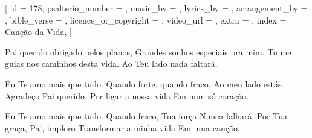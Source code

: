 [
    id                     = {178},
    psalterio_number       = {},
    music_by               = {},
    lyrics_by              = {},
    arrangement_by         = {},
    bible_verse            = {},
    licence_or_copyright   = {},
    video_url              = {},
    extra                  = {},
    index                  = {Canção da Vida},
]


\beginchorus
Pai querido obrigado pelos planos, 
Grandes sonhos especiais pra mim. 
Tu me guias nos caminhos desta vida. 
Ao Teu lado nada faltará. 
\endchorus


\beginverse
Eu Te amo mais que tudo. 
Quando forte, quando fraco, 
Ao meu lado estás. 
Agradeço Pai querido, 
Por ligar a nossa vida 
Em num só coração. 
\endverse



\beginverse
Eu Te amo mais que tudo. 
Quando fraco, Tua força 
Nunca falhará. 
Por Tua graça, Pai, imploro 
Transformar a minha vida 
Em uma canção.
\endverse



\endsong
